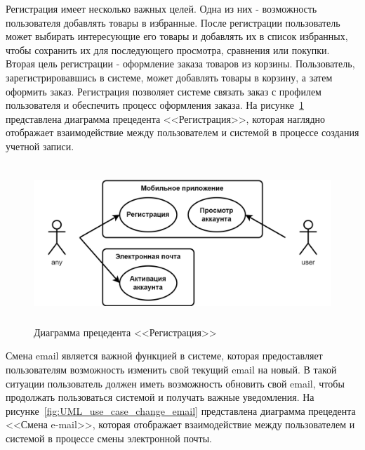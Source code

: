 
Регистрация имеет несколько важных целей. Одна из них - возможность пользователя добавлять товары в избранные.
После регистрации пользователь может выбирать интересующие его товары и добавлять их в список избранных,
чтобы сохранить их для последующего просмотра, сравнения или покупки.
Вторая цель регистрации - оформление заказа товаров из корзины.
Пользователь, зарегистрировавшись в системе, может добавлять товары в корзину,
а затем оформить заказ.
Регистрация позволяет системе связать заказ с профилем пользователя
и обеспечить процесс оформления заказа.
На рисунке~\ref{fig:UML_use_case_registration} представлена диаграмма прецедента <<Регистрация>>,
которая наглядно отображает взаимодействие между пользователем и системой в процессе создания учетной записи.

\begin{figure}[!htb]
    \centering

    \includegraphics[height=6cm]
    {images/UML/use_case/users/users.png}

    \caption{Диаграмма прецедента <<Регистрация>>}

    \label{fig:UML_use_case_registration}
\end{figure}

Смена email является важной функцией в системе,
которая предоставляет пользователям возможность изменить свой текущий email на новый.
В такой ситуации пользователь должен иметь возможность обновить свой email,
чтобы продолжать пользоваться системой и получать важные уведомления.
На рисунке~\ref{fig:UML_use_case_change_email} представлена диаграмма прецедента <<Смена e-mail>>,
которая отображает взаимодействие между пользователем и системой в процессе смены электронной почты.

